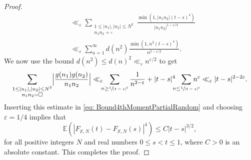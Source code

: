 \documentclass[JEP,XML,SOM,Unicode,NoFloatCountersInSection,published]{cedram}
\theoremstyle{plain}
\theoremstyle{definition}
\let\ep\varepsilon
\newcommand{\X}{\mathbb{X}}
\newcommand{\ex}{\mathbb{E}}
\begin{document}
\begin{proof}
\begin{align*}
&\ll_{\ep} \sum_{\substack{1\leq |n_1|, |n_2|\leq N^2\\ n_1n_2=\square}} \frac{\min(1, |n_1n_2|(t-s)^4)}{|n_1n_2|^{1-\ep/4}}\\
&\ll_{\ep} \sum_{n=1}^{\infty} d(n^2)\frac{\min(1, n^2(t-s)^4)}{n^{2-\ep/2}}.
\end{align*}
We now use the bound $d(n^2)\leq d(n)^2\ll_{\ep} n^{\ep/2}$ to get
\begin{equation}\label{BoundsGSum}
\sum_{\substack{1\leq |n_1|, |n_2|\leq N^2\\ n_1n_2=\square}} \Bigl|\frac{g(n_1)g(n_2)}{n_1n_2}\Bigr|
\ll_{\ep}\hspace*{-2mm}
\sum_{n \geq \sfrac{1}{|t-s|^2}} \frac{1}{n^{2-\ep}} + |t-s|^4\hspace*{-2mm}\sum_{n \leq \sfrac{1}{|t-s|^2}}\hspace*{-4mm} n^{\ep}
\ll_{\ep} |t-s|^{2-2\ep}.
\end{equation}
Inserting this estimate in \eqref{eq: Bound4thMomentPartialRandom} and choosing $\ep=1/4$ implies that
\[\ex\left(\left|F_{\X, N}(t)-F_{\X, N}(s)\right|^{4}\right)\leq C |t-s|^{3/2},\]
for all positive integers $N$ and real numbers $0\leq s<t\leq 1$, where $C>0$ is an absolute constant. This completes the proof.
\end{proof}
\end{document}
